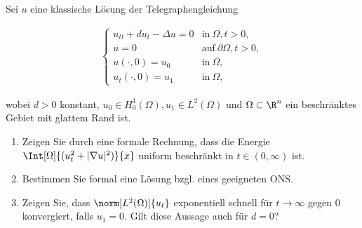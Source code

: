 
\begin{exercise}

Sei $u$ eine klassische Lösung der Telegraphengleichung

\begin{align*}
    \begin{cases}
        u_{tt} + d u_t - \Delta u = 0 & \text{in}~ \Omega, t > 0, \\
        u = 0                         & \text{auf}~ \partial \Omega, t > 0, \\
        u(\cdot, 0) = u_0             & \text{in}~ \Omega, \\
        u_t(\cdot, 0) = u_1           & \text{in}~ \Omega,
    \end{cases}
\end{align*}

wobei $d>0$ konstant, $u_0 \in H_0^1(\Omega), u_1 \in L^2(\Omega)$ und $\Omega \subset \R^n$ ein beschränktes Gebiet mit glattem Rand ist.

\begin{enumerate}[label = (\roman*)]

    \item Zeigen Sie durch eine formale Rechnung, dass die Energie $\Int[\Omega]{(u_t^2 + |\nabla u|^2)}{x}$ uniform beschränkt in $t \in (0, \infty)$ ist.

    \item Bestimmen Sie formal eine Lösung bzgl. eines geeigneten ONS.

    \item Zeigen Sie, dass $\norm[L^2(\Omega)]{u_t}$ exponentiell schnell für $t \rightarrow \infty$ gegen $0$ konvergiert, falls $u_1 = 0$.
    Gilt diese Aussage auch für $d = 0$?

\end{enumerate}

\end{exercise}


